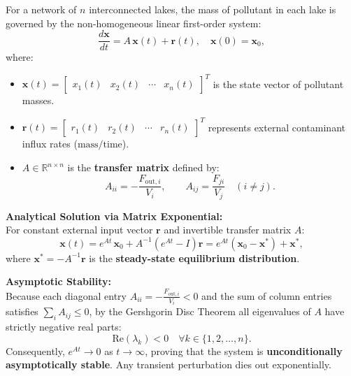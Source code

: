 \documentclass[12pt]{article}
\begin{document}
\begin{derivbox}
For a network of $n$ interconnected lakes, the mass of pollutant in each lake is governed by the non-homogeneous linear first-order system:
\begin{equation}
  \frac{d\mathbf{x}}{dt} = A\,\mathbf{x}(t) + \mathbf{r}(t), \quad \mathbf{x}(0) = \mathbf{x}_0,
\end{equation}
where:
\begin{itemize}[itemsep=2pt, topsep=2pt]
  \item $\mathbf{x}(t) = \begin{bmatrix} x_1(t) & x_2(t) & \cdots & x_n(t) \end{bmatrix}^T$ is the state vector of pollutant masses.
  \item $\mathbf{r}(t) = \begin{bmatrix} r_1(t) & r_2(t) & \cdots & r_n(t) \end{bmatrix}^T$ represents external contaminant influx rates ($\text{mass}/\text{time}$).
  \item $A \in \mathbb{R}^{n \times n}$ is the \textbf{transfer matrix} defined by:
  \begin{equation}
    A_{ii} = -\frac{F_{\text{out}, i}}{V_i}, \qquad A_{ij} = \frac{F_{ji}}{V_j} \quad (i \neq j).
  \end{equation}
\end{itemize}
\end{derivbox}

\begin{formulabox}
\textbf{Analytical Solution via Matrix Exponential:}\\
For constant external input vector $\mathbf{r}$ and invertible transfer matrix $A$:
\begin{equation}
  \mathbf{x}(t) = e^{At}\,\mathbf{x}_0 + A^{-1}\left(e^{At} - I\right)\mathbf{r} = e^{At}\left(\mathbf{x}_0 - \mathbf{x}^*\right) + \mathbf{x}^*,
\end{equation}
where $\mathbf{x}^* = -A^{-1}\mathbf{r}$ is the \textbf{steady-state equilibrium distribution}.
\end{formulabox}

\begin{notebox}
\textbf{Asymptotic Stability:}\\
Because each diagonal entry $A_{ii} = -\frac{F_{\text{out}, i}}{V_i} < 0$ and the sum of column entries satisfies $\sum_i A_{ij} \le 0$, by the Gershgorin Disc Theorem all eigenvalues of $A$ have strictly negative real parts:
\[
  \text{Re}(\lambda_k) < 0 \quad \forall k \in \{1, 2, \dots, n\}.
\]
Consequently, $e^{At} \to 0$ as $t \to \infty$, proving that the system is \textbf{unconditionally asymptotically stable}. Any transient perturbation dies out exponentially.
\end{notebox}
\end{document}
